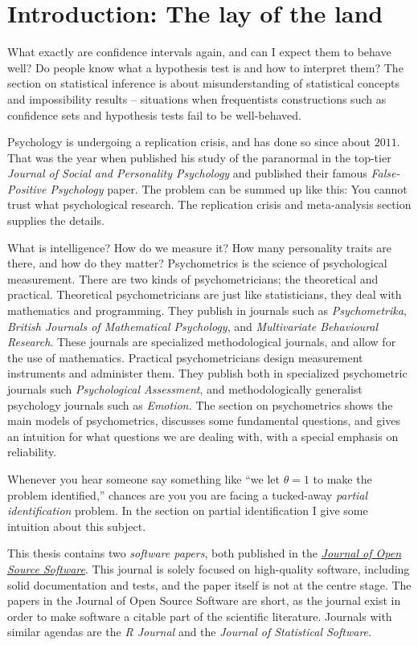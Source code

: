\section{Introduction: The lay of the land}

What exactly are confidence intervals again, and can I expect them to behave well? Do people know what a hypothesis test is and how to interpret them? The section on statistical inference is about misunderstanding of statistical concepts and impossibility results -- situations when frequentists constructions such as confidence sets and hypothesis tests fail to be well-behaved. 

Psychology is undergoing a replication crisis, and has done so since about $2011$. That was the year when \textcite{Bem2011-vq} published his study of the paranormal in the top-tier \textit{Journal of Social and Personality Psychology} and \textcite{simmons_false-positive_2011} published their famous \textit{False-Positive Psychology} paper. The problem can be summed up like this: You cannot trust what psychological research. The replication crisis and meta-analysis section supplies the details.

What is intelligence? How do we measure it? How many personality traits are there, and how do they matter? Psychometrics is the science of psychological measurement. There are two kinds of psychometricians; the theoretical and practical. Theoretical psychometricians are just like statisticians, they deal with mathematics and programming. They publish in journals such as \textit{Psychometrika}, \textit{British Journals of Mathematical Psychology}, and \textit{Multivariate Behavioural Research}. These journals are specialized methodological journals, and allow for the use of mathematics. Practical psychometricians design measurement instruments and administer them. They publish both in specialized psychometric journals such \textit{Psychological Assessment}, and methodologically generalist psychology journals such as \textit{Emotion.} The section on psychometrics shows the main models of psychometrics, discusses some fundamental questions, and gives an intuition for what questions we are dealing with, with a special emphasis on reliability.

Whenever you hear someone say something like ``we let $\theta=1$ to make the problem identified,'' chances are you you are facing a tucked-away \textit{partial identification} problem. In the section on partial identification I give some intuition about this subject.

This thesis contains two \textit{software papers}, both published in the \href{https://joss.theoj.org/}{\textit{Journal of Open Source Software}}. This journal is solely focused on high-quality software, including solid documentation and tests, and the paper itself is not at the centre stage. The papers in the Journal of Open Source Software are short, as the journal exist in order to make software a citable part of the scientific literature. Journals with similar agendas are the \textit{R Journal} and the \textit{Journal of Statistical Software}.